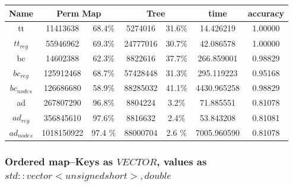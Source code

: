 \documentclass[]{article}
\theoremstyle{definition}
\begin{document}
\begin{center}
\begin{tabular} { |c|c|c|c|c|c|c| }
\hline
Name & \multicolumn{2}{c|}{Perm Map} & \multicolumn{2}{c|}{Tree} & time & accuracy \\
\hline

tt & 11413638 & 68.4\%  & 5274016 & 31.6\% & 14.426219 & 1.00000 \\

$tt_{reg}$ & 55946962 & 69.3\% & 24777016 & 30.7\% & 42.086578 & 1.00000 \\

bc & 14602388 & 62.3\% & 8822616 & 37.7\% & 266.859001 & 0.98829 \\

$bc_{reg}$ & 125912468 & 68.7\% & 57428448 & 31.3\% & 295.119223 & 0.95168 \\

$bc_{nodes}$ & 126686680 & 58.9\% & 88285032 & 41.1\% & 4430.965258 & 0.98829 \\

ad & 267807290 & 96.8\% & 8804224 & 3.2\% & 71.885551 & 0.81078 \\

$ad_{reg}$ & 356845610 & 97.6\% & 8816632 & 2.4\% & 53.843208 & 0.81081 \\

$ad_{nodes}$ & 1018150922 & 97.4 \% & 88000704 & 2.6 \% & 7005.960590 &  0.81078\\
\hline
\end{tabular}
\end{center}

\subsubsection{Ordered map--Keys as $VECTOR$, values as $std::vector<unsigned short>, double$}
\end{document}
